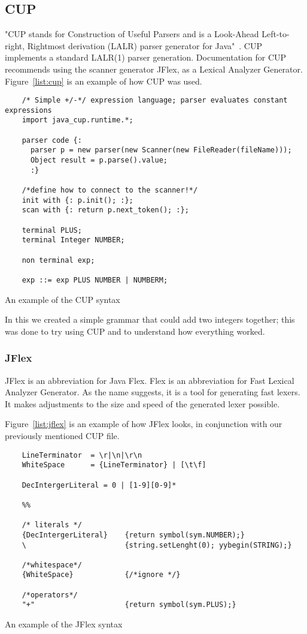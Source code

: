 \subsection{CUP}
"CUP stands for Construction of Useful Parsers and is a Look-Ahead Left-to-right, Rightmost derivation (LALR) parser generator for Java"~\cite{cupParserGenerator}. CUP implements a standard LALR(1) parser generation. Documentation for CUP recommends using the scanner generator JFlex, as a Lexical Analyzer Generator. Figure~\ref{list:cup} is an example of how CUP was used.


\begin{listing}[htb!]
  \centering
  \begin{verbatim}
    /* Simple +/-*/ expression language; parser evaluates constant expressions
    import java_cup.runtime.*;

    parser code {:
      parser p = new parser(new Scanner(new FileReader(fileName)));
      Object result = p.parse().value;  
      :}

    /*define how to connect to the scanner!*/
    init with {: p.init(); :};
    scan with {: return p.next_token(); :};

    terminal PLUS;
    terminal Integer NUMBER;

    non terminal exp;

    exp ::= exp PLUS NUMBER | NUMBERM;
  \end{verbatim}
  \caption{An example of the CUP syntax}
  \label{list:cup}
\end{listing}

In this we created a simple grammar that could add two integers together; this was done to try using CUP and to understand how everything worked.


\subsubsection{JFlex}
JFlex is an abbreviation for Java Flex. Flex is an abbreviation for Fast Lexical Analyzer Generator. As the name suggests, it is a tool for generating fast lexers. It makes adjustments to the size and speed of the generated lexer possible.

Figure~\ref{list:jflex} is an example of how JFlex looks, in conjunction with our previously mentioned CUP file.


\begin{listing}[htb!]
  \centering
  \begin{verbatim}
    LineTerminator  = \r|\n|\r\n
    WhiteSpace      = {LineTerminator} | [\t\f]

    DecIntergerLiteral = 0 | [1-9][0-9]*

    %%

    /* literals */
    {DecIntergerLiteral}    {return symbol(sym.NUMBER);}
    \                       {string.setLenght(0); yybegin(STRING);}

    /*whitespace*/ 
    {WhiteSpace}            {/*ignore */}  
    
    /*operators*/
    "+"                     {return symbol(sym.PLUS);}
  \end{verbatim}
  \caption{An example of the JFlex syntax}
  \label{list:jflex}
\end{listing}

